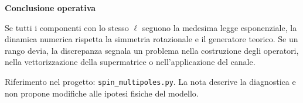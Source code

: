 \documentclass[10pt,a4paper]{article}
\newcommand{\cardtitle}[1]{{\sffamily\bfseries\color{Navy}#1\par}\smallskip}
\newcommand{\muted}[1]{{\color{Muted}#1}}
\begin{document}
\vspace{4mm}
\begin{notebox}
  \cardtitle{Conclusione operativa}
  Se tutti i componenti con lo stesso $\ell$ seguono la medesima legge
  esponenziale, la dinamica numerica rispetta la simmetria rotazionale e il
  generatore teorico. Se un rango devia, la discrepanza segnala un problema
  nella costruzione degli operatori, nella vettorizzazione della supermatrice
  o nell'applicazione del canale.
\end{notebox}

\vfill
\muted{Riferimento nel progetto: \texttt{spin\_multipoles.py}. La nota descrive
la diagnostica e non propone modifiche alle ipotesi fisiche del modello.}
\end{document}
